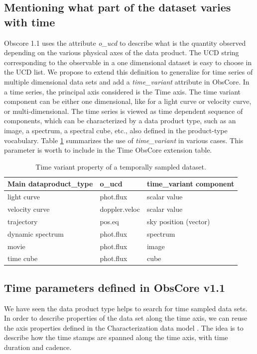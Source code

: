 \documentclass[11pt,a4paper]{ivoa}
\begin{document}
\subsection{Mentioning what part of the dataset varies with time }
\label{sec:timevariant}
Obscore 1.1 uses the attribute \emph{o\_ucd} to describe what is the quantity observed depending on the various physical axes of the data product. The  UCD string corresponding to the observable in  a one dimensional dataset is  easy to choose in the UCD list.  We propose to extend this definition to generalize for time series of multiple dimensional data sets and add a \emph{time\_variant} attribute in ObsCore.
In a time series, the principal axis considered is the Time axis. The time variant component can be either one dimensional, like for a light curve or velocity curve, or multi-dimensional. The time series is viewed as  time dependent sequence of components, which can be characterized  by a data product type, such as an image, a spectrum, a spectral cube, etc., also  defined in the product-type vocabulary. Table \ref{tab:timevar} summarizes the use of \emph{ time\_variant}  in various cases.
This parameter is worth to include in the Time ObsCore extension table.

\begin{table}[!htb]
   \begin{center}
  \caption{Time variant property of a temporally sampled dataset.  \label{tab:timevar} }

  \begin{small}
  \begin{tabular}{|l|l|l|}
\sptablerule
\textbf{Main dataproduct\_type} & \textbf{o\_ucd}  &\textbf{time\_variant component }   \\ \hline
light curve & phot.flux &  scalar value \\ \hline
velocity curve & doppler.veloc & scalar value \\ \hline
trajectory & pos.eq  &  sky position (vector) \\ \hline
dynamic spectrum & phot.flux & spectrum \\ \hline
movie &   phot.flux & image \\ \hline
time cube & phot.flux & cube \\ \hline
 \end{tabular}
  \end{small}
  \end{center}
 \end{table}

 \subsection{Time parameters defined in ObsCore v1.1}
 \label{sec:alreadythere}
 We have seen the data product type helps to search for time sampled data sets.
 In order to describe properties of the data set along the time axis, we can reuse the axis properties defined in the Characterization data model \cite{2008ivoa.spec.0325L}.
 The idea is to describe how the time stamps are spanned along the time axis, with time duration and  cadence.
\end{document}
